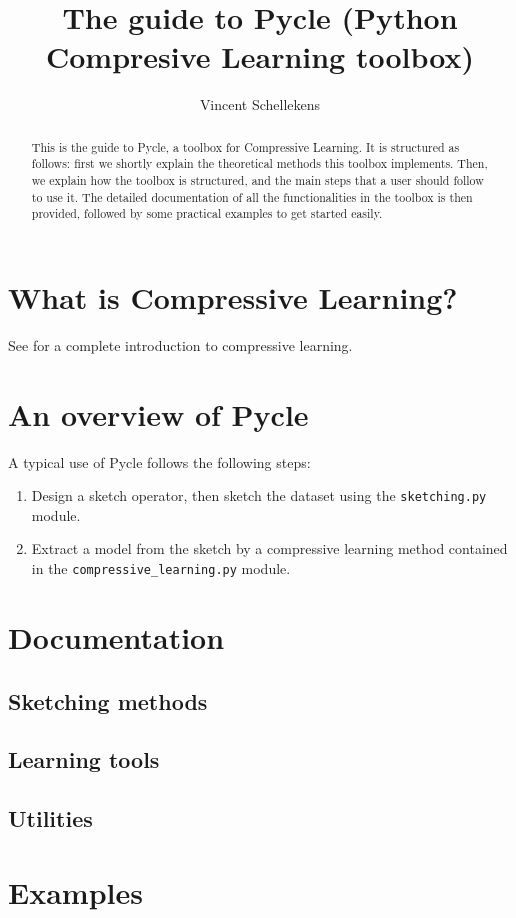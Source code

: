 \documentclass[]{article}
\title{The guide to Pycle (\textbf{Py}thon \textbf{C}ompresive \textbf{Le}arning toolbox)}
\author{Vincent Schellekens}
\newcommand{\code}{\texttt}
\begin{document}

\maketitle

\begin{abstract}
	This is the guide to Pycle, a toolbox for Compressive Learning. It is structured as follows: first we shortly explain the theoretical methods this toolbox implements. Then, we explain how the toolbox is structured, and the main steps that a user should follow to use it. The detailed documentation of all the functionalities in the toolbox is then provided, followed by some practical examples to get started easily.
\end{abstract}


\section{What is Compressive Learning?}
See \cite{gribonval2017compressive} for a complete introduction to compressive learning.

\section{An overview of Pycle}

A typical use of Pycle follows the following steps:
\begin{enumerate}
	\item Design a sketch operator, then sketch the dataset using the \code{sketching.py} module.
	\item Extract a model from the sketch by a compressive learning method contained in the \code{compressive\_learning.py} module.
\end{enumerate}



\section{Documentation}
\subsection{Sketching methods} 

\subsection{Learning tools} 

\subsection{Utilities} 

\section{Examples}


\newpage


\end{document}
